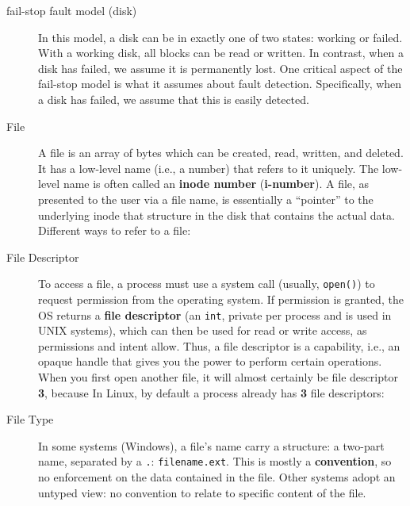 \begin{description}
\item[fail-stop fault model (disk)]  In this model, a disk can be in exactly one of two states: working or failed. With a working disk, all blocks can be read or written. In contrast, when a disk has failed, we assume it is permanently lost. One critical aspect of the fail-stop model is what it assumes about fault detection. Specifically, when a disk has failed, we assume that this is easily detected.

\item[File] A file is an array of bytes which can be created, read, written, and deleted. It has a low-level name (i.e., a number) that refers to it uniquely. The low-level name is often called an \textbf{inode number} (\textbf{i-number}).  A file, as presented to the user via a file name, is essentially a “pointer” to the underlying inode that structure in the disk that contains the actual data. Different ways to refer to a file:

\item[File Descriptor] To access a file, a process must use a system call (usually, \texttt{open()}) to request permission from the operating system. If permission is granted, the OS returns a \textbf{file descriptor} (an \texttt{int}, private per process and is used in UNIX systems), which can then be used for read or write access, as permissions and intent allow.  Thus, a file descriptor is a capability, i.e., an opaque handle that gives you the power to perform certain operations.  When you first open another file, it will almost certainly be file descriptor \textbf{3}, because In Linux, by default a process already has \textbf{3} file descriptors:


\item[File Type]  In some systems (Windows), a file's name carry a structure: a two-part name, separated by a \texttt{.}: \texttt{filename.ext}. This is mostly a \textbf{convention}, so no enforcement on the data contained in the file. Other systems adopt an untyped view: no convention to relate to specific content of the file.


\end{description}
